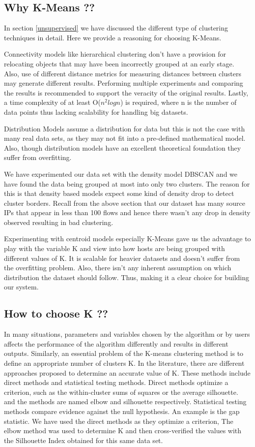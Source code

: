\subsection{Why K-Means ??}
 In section \ref{unsupervised} we have discussed the different type of clustering techniques in detail. Here we provide a reasoning for choosing K-Means.
 
Connectivity models like hierarchical clustering don't have a provision for relocating objects that may have been incorrectly grouped at an early stage. Also, use of different distance metrics for measuring distances between clusters may generate different results. Performing multiple experiments and comparing
the results is recommended to support the veracity of
the original results. Lastly, a time complexity of at least O($n^2logn$) is required, where n is the number of data points thus lacking scalability for handling big datasets.

Distribution Models assume a distribution for data but this is not the case with many real data sets, as they may not fit into a pre-defined mathematical model. Also, though distribution models have an excellent theoretical foundation they suffer from overfitting. 

We have experimented our data set with the density model DBSCAN and we have found the data being grouped at most into only two clusters. The reason for this is that density based models expect some kind of density drop to detect cluster borders. Recall from the above section that our dataset has many source IPs that appear in less than 100 flows and hence there wasn't any drop in density observed resulting in bad clustering.

Experimenting with centroid models especially K-Means gave us the advantage to play with the variable K and view into how hosts are being grouped with different values of K. It is scalable for heavier datasets and doesn't suffer from the overfitting problem. Also, there isn't any inherent assumption on which distribution the dataset should follow. Thus, making it a clear choice for building our system.


\subsection{How to choose K ??}
 In many situations, parameters and variables chosen by the algorithm or by users affects the performance of the algorithm differently and results in different outputs. Similarly, an essential problem of the K-means clustering method is to define an appropriate number of clusters K. In the literature, there are different approaches proposed to determine an accurate value of K.
 These methods include direct methods and statistical testing methods. Direct methods optimize a criterion, such as the within-cluster sums of squares or the average silhouette. and the methods are named elbow and silhouette respectively. Statistical testing methods compare evidence against the null hypothesis. An example is the gap statistic. We have used the direct methods as they optimize a criterion, The elbow method was used to determine K and then cross-verified the values with the Silhouette Index obtained for this same data set.
 

